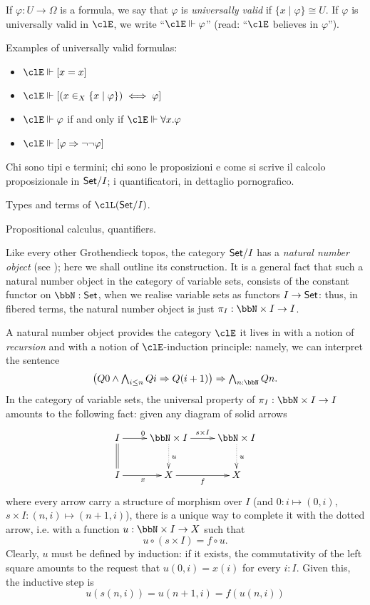 If $\varphi : U\to\Omega$ is a formula, we say that $\varphi$ is \emph{universally valid} if $\{x\mid\varphi\}\cong U$. If $\varphi$ is universally valid in $\clE$, we write ``$\clE\Vdash \varphi$'' (read: ``$\clE$ believes in $\varphi$'').

Examples of universally valid formulas:
\begin{itemize}
	\item $\clE\Vdash [x=x]$
	\item $\clE\Vdash [(x \in_X \{x\mid\varphi\}) \iff \varphi]$
	\item $\clE\Vdash \varphi$ if and only if $\clE \Vdash \forall x.\varphi$
	\item $\clE\Vdash [\varphi \Rightarrow \lnot\lnot\varphi]$
\end{itemize}
Chi sono tipi e termini; chi sono le proposizioni e come si scrive il calcolo proposizionale in $\mathsf{Set}/I$; i quantificatori, in dettaglio pornografico.
\begin{definition}
	Types and terms of $\clL(\Set/I)$.
\end{definition}
\begin{definition}
	Propositional calculus, quantifiers.
\end{definition}
\begin{remark}
	Like every other Grothendieck topos, the category $\mathsf{Set}/I$ has a \emph{natural number object} (see \cite[??]{mac1992sheaves}); here we shall outline its construction. It is a general fact that such a natural number object in the category of variable sets, consists of the constant functor on $\bbN : \Set$, when we realise variable sets as functors $I \to \mathsf{Set}$: thus, in fibered terms, the natural number object is just $\pi_I : \bbN \times I \to I$.

	A natural number object provides the category $\clE$ it lives in with a notion of \emph{recursion} and with a notion of $\clE$-induction principle: namely, we can interpret the sentence
	\[\textstyle\big(Q0\land \bigwedge_{i\le n} Qi\Rightarrow Q(i+1)\big)\Rightarrow \bigwedge_{n : \bbN} Qn.\]
	In the category of variable sets, the universal property of $\pi_I : \bbN\times I \to I$ amounts to the following fact: given any diagram of solid arrows 
	\[
	\xymatrix{
		I \ar[r]^0 \ar@{=}[d] & \bbN\times I\ar@{.>}[d]^u \ar[r]^{s\times I} & \bbN \times I\ar@{.>}[d]^u \\ 
		I \ar[r]_x & X \ar[r]_f & X
	}	
	\]
	where every arrow carry a structure of morphism over $I$ (and $0 : i \mapsto (0,i)$, $s\times I : (n,i) \mapsto (n+1,i)$), there is a unique way to complete it with the dotted arrow, i.e. with a function $u : \bbN \times I \to X$ such that 
	\[u \circ (s\times I) = f \circ u.\]
	Clearly, $u$ must be defined by induction: if it exists, the commutativity of the left square amounts to the request that $u(0,i)=x(i)$ for every $i : I$. Given this, the inductive step is 
	\[ 
		u(s(n,i)) = u(n+1,i) = f(u(n,i))
	\]
\end{remark}
